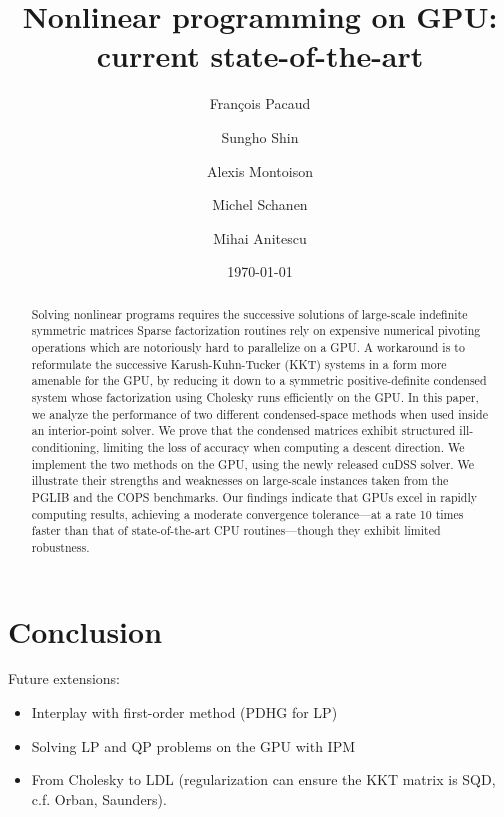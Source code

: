 \documentclass{article}
\title{Nonlinear programming on GPU: current state-of-the-art}
\author{François Pacaud \and
Sungho Shin \and
Alexis Montoison \and
Michel Schanen \and
Mihai Anitescu
}
\date{\today}
\theoremstyle{definition}
\theoremstyle{remark}
\begin{document}
\maketitle

\begin{abstract}
  Solving nonlinear programs requires the
  successive solutions of large-scale indefinite symmetric matrices
  Sparse factorization routines rely
  on expensive numerical pivoting operations
  which are notoriously hard to parallelize on a GPU.
  A workaround is to reformulate the successive Karush-Kuhn-Tucker (KKT) systems
  in a form more amenable for the GPU,
  by reducing it down to a symmetric positive-definite condensed
  system whose factorization using Cholesky runs efficiently on the GPU.
  In this paper, we analyze the performance of two different condensed-space methods
  when used inside an interior-point solver.
  We prove that the condensed matrices exhibit structured ill-conditioning,
  limiting the loss of accuracy when computing a descent direction.
  We implement the two methods on the GPU, using the newly
  released cuDSS solver. We illustrate their strengths and weaknesses
  on large-scale instances taken from the PGLIB and the COPS benchmarks.
  Our findings indicate that GPUs excel in rapidly computing results,
  achieving a moderate convergence tolerance---at a rate 10 times faster
  than that of state-of-the-art CPU routines---though they exhibit
  limited robustness.
\end{abstract}











\section{Conclusion}
Future extensions:
\begin{itemize}
  \item Interplay with first-order method (PDHG for LP)
  \item Solving LP and QP problems on the GPU with IPM
  \item From Cholesky to LDL (regularization can
    ensure the KKT matrix is SQD, c.f. Orban, Saunders).
\end{itemize}





% 
\end{document}
